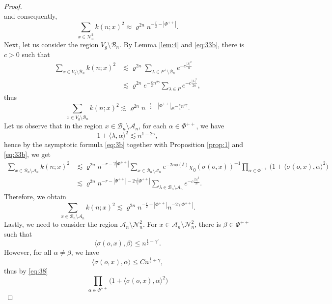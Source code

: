 \documentclass[11pt]{amsart}
\newcommand{\calB}{\mathcal{B}}
\newcommand{\calA}{\mathcal{A}}
\newcommand{\scrA}{\mathscr{A}}
\newcommand{\scrB}{\mathscr{B}}
\newcommand{\scrN}{\mathscr{N}}
\newcommand{\sprod}[2]{\langle {#1}, {#2} \rangle}
\theoremstyle{plain}
\theoremstyle{definition}
\numberwithin{equation}{section}
\begin{document}
\begin{proof}
\[	\]
	and consequently,
	\begin{equation}
		\label{eq:34}
		\sum_{x \in \scrN_n^2} k(n; x)^2 \approx \varrho^{2n} n^{-\frac{r}{2} - |\Phi^{++}|}.
	\end{equation}
	Next, let us consider the region $V_g \setminus \scrB_n$. By Lemma \ref{lem:4} and \eqref{eq:33b}, there is $c > 0$ 
	such that 
	\begin{align*}
		\sum_{x \in V_g \setminus \scrB_n}
		k(n; x)^2 
		&\lesssim 
		\varrho^{2n} 
		\sum_{\lambda \in P^+ \setminus \calB_n} e^{-c \frac{|\lambda|^2}{n}} \\
		&\lesssim
		\varrho^{2n}
		e^{-\frac{c}{2} n^{2\gamma}} \sum_{\lambda \in P} e^{-c \frac{|\lambda|^2}{2n}},
	\end{align*}
	thus
	\begin{equation}
		\label{eq:36}
		\sum_{x \in V_g \setminus \scrB_n} k(n; x)^2
		\lesssim \varrho^{2n} n^{-\frac{r}{2} - |\Phi^{++}|} e^{-\frac{c}{4} n^{2\gamma}}.
	\end{equation}
	Let us observe that in the region $x \in \scrB_n \setminus \scrA_n$, for each $\alpha \in \Phi^{++}$, 
	we have
	\[
		1 + \sprod{\lambda}{\alpha}^2 \lesssim n^{1- 2 \gamma}, 
	\]
	hence by the asymptotic formula \eqref{eq:3b} together with Proposition \ref{prop:1} and \eqref{eq:33b}, we get
	\begin{align*}
		\sum_{x \in \scrB_n \setminus \scrA_n} k(n; x)^2
		&\lesssim
		\varrho^{2n} n^{-r - 2 |\Phi^{++}|} 
		\sum_{x \in \scrB_n \setminus \scrA_n}
		e^{-2n \phi(\delta)} \chi_0(\sigma(o, x))^{-1} 
		\prod_{\alpha \in \Phi^{++}} \big(1 + \sprod{\sigma(o, x)}{\alpha}^2\big) \\
		&\lesssim
		\varrho^{2n} n^{-r -|\Phi^{++}|-2 \gamma|\Phi^{++}|}
		\sum_{\lambda \in \calB_n \setminus \calA_n} e^{-c \frac{|\lambda|^2}{n}}.
	\end{align*}
	Therefore, we obtain
	\begin{equation}
		\label{eq:37}
		\sum_{x \in \scrB_n \setminus \scrA_n} k(n; x)^2
		\lesssim
		\varrho^{2n} n^{-\frac{r}{2} -|\Phi^{++}|} n^{-2 \gamma|\Phi^{++}|}.
	\end{equation}
	Lastly, we need to consider the region $\scrA_n \setminus \scrN_n^2$. For $x \in \scrA_n \setminus \scrN_n^2$, there
	is $\beta \in \Phi^{++}$ such that
	\[
		\sprod{\sigma(o, x)}{\beta} \leqslant n^{\frac{1}{2}-\gamma'}.
	\]
	However, for all $\alpha \neq \beta$, we have
	\[
		\sprod{\sigma(o, x)}{\alpha} \leqslant C n^{\frac12+\gamma},
	\]
	thus by \eqref{eq:38}
	\[
		\prod_{\alpha \in \Phi^{++}} \big(1 + \sprod{\sigma(o, x)}{\alpha}^2\big)
\]
\end{proof}
\end{document}
